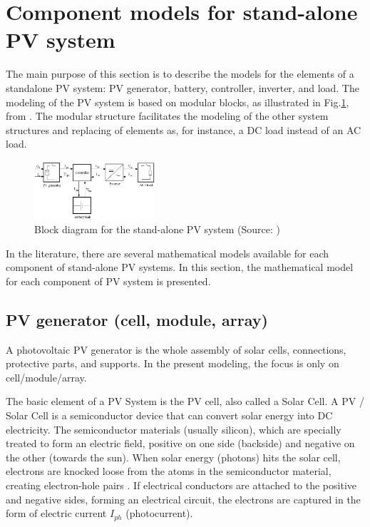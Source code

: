 \documentclass[journal]{IEEEtran}
\begin{document}
\section{Component models for stand-alone PV system }
The main purpose of this section is to describe the models for the elements of a standalone PV system: PV generator, battery, controller, inverter, and load. The modeling of the PV system is based on modular blocks, as illustrated in Fig.\ref{fig:blockdiagram}, from \cite{Hansen}. The modular structure facilitates the modeling of the other system structures and replacing of elements as, for instance, a DC load instead of an AC load. 

\begin{figure}[h]
\includegraphics[width=0.4\textwidth]{blockdiagramPVS}
\centering
\caption{Block diagram for the stand-alone PV system (Source: \cite{Hansen})}
\label{fig:blockdiagram}
\end{figure}

In the literature, there are several mathematical models available for each component of stand-alone PV systems. In this section, the mathematical model for each component of PV system is presented. 

\subsection{PV generator (cell, module, array) }
A photovoltaic PV generator is the whole assembly of solar cells, connections, protective parts, and supports. In the present modeling, the focus is only on cell/module/array.
 
The basic element of a PV System is the PV cell, also called a Solar Cell. A PV / Solar Cell is a semiconductor device that can convert solar energy into DC electricity. The semiconductor materials (usually silicon), which are specially treated to form an electric field, positive on one side (backside) and negative on the other (towards the sun). When solar energy (photons) hits the solar cell, electrons are knocked loose from the atoms in the semiconductor material, creating electron-hole pairs \cite{Lorenzo}. If electrical conductors are attached to the positive and negative sides, forming an electrical circuit, the electrons are captured in the form of electric current $ I_{ph} $ (photocurrent).
 
\end{document}
